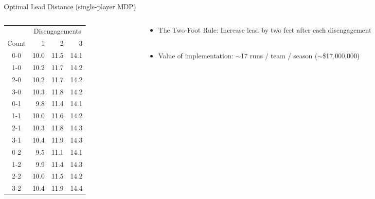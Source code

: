 \documentclass{beamer}
\begin{document}
  \begin{frame}{Optimal Lead Distance (single-player MDP)}
    \begin{columns}
      \begin{column}{0.5\textwidth}
        \centering
        \begin{tabular}{c|rrr}
          & \multicolumn{3}{c}{Disengagements}\\
          Count & 1 & 2 & 3\\
          \hline
          0-0 & 10.0 & 11.5 & 14.1 \\ 
          1-0 & 10.2 & 11.7 & 14.2 \\ 
          2-0 & 10.2 & 11.7 & 14.2 \\ 
          3-0 & 10.3 & 11.8 & 14.2 \\ 
          \hline
          0-1 & 9.8 & 11.4 & 14.1 \\ 
          1-1 & 10.0 & 11.6 & 14.2 \\ 
          2-1 & 10.3 & 11.8 & 14.3 \\ 
          3-1 & 10.4 & 11.9 & 14.3 \\ 
          \hline
          0-2 & 9.5 & 11.1 & 14.1 \\ 
          1-2 & 9.9 & 11.4 & 14.3 \\ 
          2-2 & 10.0 & 11.5 & 14.2 \\ 
          3-2 & 10.4 & 11.9 & 14.4
        \end{tabular}
      \end{column}
      \begin{column}{0.5\textwidth}
        \begin{itemize}
          \item \alert{The Two-Foot Rule:} Increase lead by two feet after each disengagement\\
          ~\\
          \item Value of implementation: $\sim$17 runs / team / season ($\sim$\$17,000,000)
        \end{itemize}
      \end{column}
    \end{columns}
  \end{frame}
\end{document}
